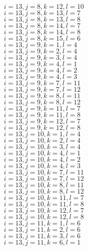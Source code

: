 \documentclass[14pt]{article}
\begin{document}
    $i=13,j=8,k=12,l=10 $ \\ 
    $i=13,j=8,k=13,l=7 $ \\ 
    $i=13,j=8,k=13,l=8 $ \\ 
    $i=13,j=8,k=14,l=7 $ \\ 
    $i=13,j=8,k=14,l=8 $ \\ 
    $i=13,j=8,k=15,l=6 $ \\ 
    $i=13,j=9,k=1,l=4 $ \\ 
    $i=13,j=9,k=2,l=4 $ \\ 
    $i=13,j=9,k=3,l=4 $ \\ 
    $i=13,j=9,k=4,l=1 $ \\ 
    $i=13,j=9,k=4,l=2 $ \\ 
    $i=13,j=9,k=4,l=3 $ \\ 
    $i=13,j=9,k=7,l=11 $ \\ 
    $i=13,j=9,k=7,l=12 $ \\ 
    $i=13,j=9,k=8,l=11 $ \\ 
    $i=13,j=9,k=8,l=12 $ \\ 
    $i=13,j=9,k=11,l=7 $ \\ 
    $i=13,j=9,k=11,l=8 $ \\ 
    $i=13,j=9,k=12,l=7 $ \\ 
    $i=13,j=9,k=12,l=8 $ \\ 
    $i=13,j=10,k=1,l=4 $ \\ 
    $i=13,j=10,k=2,l=4 $ \\ 
    $i=13,j=10,k=3,l=4 $ \\ 
    $i=13,j=10,k=4,l=1 $ \\ 
    $i=13,j=10,k=4,l=2 $ \\ 
    $i=13,j=10,k=4,l=3 $ \\ 
    $i=13,j=10,k=7,l=11 $ \\ 
    $i=13,j=10,k=7,l=12 $ \\ 
    $i=13,j=10,k=8,l=11 $ \\ 
    $i=13,j=10,k=8,l=12 $ \\ 
    $i=13,j=10,k=11,l=7 $ \\ 
    $i=13,j=10,k=11,l=8 $ \\ 
    $i=13,j=10,k=12,l=7 $ \\ 
    $i=13,j=10,k=12,l=8 $ \\ 
    $i=13,j=11,k=1,l=6 $ \\ 
    $i=13,j=11,k=2,l=6 $ \\ 
    $i=13,j=11,k=3,l=6 $ \\ 
    $i=13,j=11,k=6,l=1 $ \\ 
\end{document}
